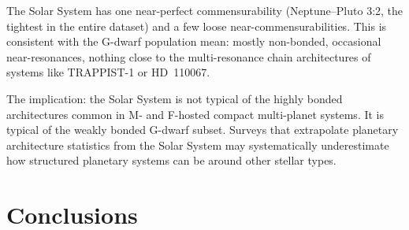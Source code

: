 \documentclass[twocolumn]{aastex631}
\begin{document}
The Solar System has one near-perfect commensurability (Neptune--Pluto 3:2,
the tightest in the entire dataset) and a few loose near-commensurabilities.
This is consistent with the G-dwarf population mean: mostly non-bonded,
occasional near-resonances, nothing close to the multi-resonance chain architectures of
systems like TRAPPIST-1 or HD~110067.

The implication: the Solar System is not typical of the highly bonded
architectures common in M- and F-hosted compact multi-planet systems. It is
typical of the weakly bonded G-dwarf subset. Surveys that extrapolate
planetary architecture statistics from the Solar System may systematically
underestimate how structured planetary systems can be around other stellar
types.

\section{Conclusions}
\label{sec:conclusions}
\end{document}
